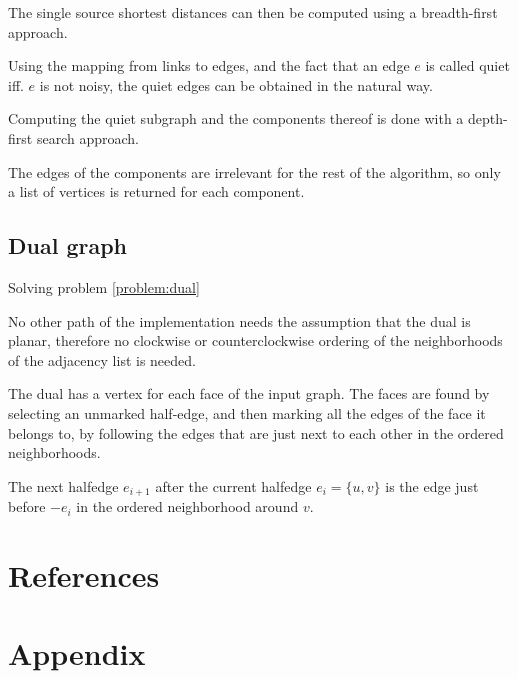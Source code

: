 \documentclass{article}
\begin{document}
		The single source shortest distances can then be computed using a breadth-first approach.

		Using the mapping from links to edges, and the fact that an edge $e$ is called quiet iff. $e$ is not noisy, the quiet edges can be obtained in the natural way.

		Computing the quiet subgraph and the components thereof is done with a depth-first search approach.

		The edges of the components are irrelevant for the rest of the algorithm, so only a list of vertices is returned for each component.


	\subsection{Dual graph}\label{impl:dual}

		Solving problem \ref{problem:dual}

		No other path of the implementation needs the assumption that the dual is planar, therefore no clockwise or counterclockwise ordering of the neighborhoods of the adjacency list is needed.

		The dual has a vertex for each face of the input graph. The faces are found by selecting an unmarked half-edge, and then marking all the edges of the face it belongs to, by following the edges that are just next to each other in the ordered neighborhoods.


		The next halfedge $e_{i+1}$ after the current halfedge $e_i = \{u, v\}$ is the edge just before $-e_i$ in the ordered neighborhood around $v$.



\newpage
\section{References}
	\printbibliography

\newpage
\section{Appendix}
\end{document}
